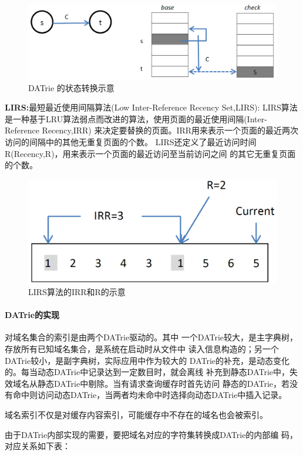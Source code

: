 \begin{figure}[H]
\centering
\includegraphics[keepaspectratio, scale=0.4]{pitures/aaa.png}
\caption{ DATrie 的状态转换示意} 
\end{figure}

\noindent \textbf{LIRS:}最短最近使用间隔算法(Low Inter-Reference Recency Set,LIRS): LIRS算法
	是一种基于LRU算法弱点而改进的算法，使用页面的最近使用间隔(Inter-Reference Recency,IRR)
	来决定要替换的页面。IRR用来表示一个页面的最近两次访问的间隔中的其他无重复页面的个数。
	LIRS还定义了最近访问时间R(Recency,R)，用来表示一个页面的最近访问至当前访问之间
	的其它无重复页面的个数。


\begin{figure}[H]
\centering
\includegraphics[keepaspectratio, scale=0.4]{pitures/irr.png}
\caption{LIRS算法的IRR和R的示意} 
\end{figure}

\paragraph{DATrie的实现\\[5pt]}
	对域名集合的索引是由两个DATrie驱动的。其中
	一个DATrie较大，是主字典树，存放所有已知域名集合，是系统在启动时从文件中
	读入信息构造的；另一个DATrie较小，是副字典树，实际应用中作为较大的
	DATrie的补充，是动态变化的。每当动态DATrie中记录达到一定数目时，就会离线
	补充到静态DATrie中，失效域名从静态DATrie中剔除。当有请求查询缓存时首先访问
	静态的DATrie，若没有命中则访问动态DATrie，当两者均未命中时选择向动态DATrie中插入记录。
	\par
	 {域名索引不仅是对缓存内容索引，可能缓存中不存在的域名也会被索引。 }
	 \par{由于DATrie内部实现的需要，要把域名对应的字符集转换成DATrie的内部编
	 码，对应关系如下表：}

